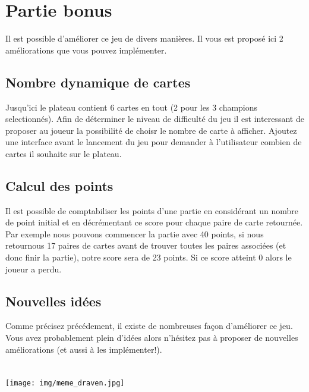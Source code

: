 \documentclass[a4paper,11pt]{article}
\theoremstyle{mytheor}
\begin{document}
\section{Partie bonus}
Il est possible d'améliorer ce jeu de divers manières. Il vous est proposé ici 2 améliorations que vous pouvez implémenter.
\subsection{Nombre dynamique de cartes}
Jusqu'ici le plateau contient 6 cartes en tout (2 pour les 3 champions selectionnés). Afin de déterminer le niveau de difficulté du jeu il est interessant de proposer au joueur la possibilité de choisr le nombre de carte à afficher. Ajoutez une interface avant le lancement du jeu pour demander à l'utilisateur combien de cartes il souhaite sur le plateau. 

\subsection{Calcul des points}
Il est possible de comptabiliser les points d'une partie en considérant un nombre de point initial et en décrémentant ce score pour chaque paire de carte retournée. Par exemple nous pouvons commencer la partie avec 40 points, si nous retournous 17 paires de cartes avant de trouver toutes les paires associées (et donc finir la partie), notre score sera de 23 points. Si ce score atteint 0 alors le joueur a perdu. 

\subsection{Nouvelles idées}
Comme précisez précédement, il existe de nombreuses façon d'améliorer ce jeu. Vous avez probablement plein d'idées alors n'hésitez pas à proposer de nouvelles améliorations (et aussi à les implémenter!).
\\
\\
\\

\texttt{[image: img/meme\_draven.jpg]}
\end{document}
